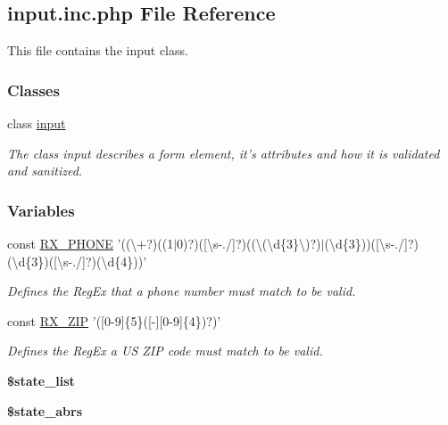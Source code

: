 \hypertarget{input_8inc_8php}{\subsection{input.\-inc.\-php File Reference}
\label{input_8inc_8php}
}


This file contains the input class.  


\subsubsection*{Classes}
\begin{DoxyCompactItemize}
\item 
class \hyperlink{classinput}{input}
\begin{DoxyCompactList}\small\item\em The class input describes a form element, it's attributes and how it is validated and sanitized. \end{DoxyCompactList}\end{DoxyCompactItemize}
\subsubsection*{Variables}
\begin{DoxyCompactItemize}
\item 
\hypertarget{input_8inc_8php_a28a895521a5452ff587c2433af17a5f6}{const \hyperlink{input_8inc_8php_a28a895521a5452ff587c2433af17a5f6}{R\-X\-\_\-\-P\-H\-O\-N\-E} '((\textbackslash{}+?)((1$|$0)?)(\mbox{[}\textbackslash{}s-\/./\mbox{]}?)((\textbackslash{}(\textbackslash{}d\{3\}\textbackslash{})?)$|$(\textbackslash{}d\{3\}))(\mbox{[}\textbackslash{}s-\/./\mbox{]}?)(\textbackslash{}d\{3\})(\mbox{[}\textbackslash{}s-\/./\mbox{]}?)(\textbackslash{}d\{4\}))'}\label{input_8inc_8php_a28a895521a5452ff587c2433af17a5f6}

\begin{DoxyCompactList}\small\item\em Defines the Reg\-Ex that a phone number must match to be valid. \end{DoxyCompactList}\item 
\hypertarget{input_8inc_8php_a4dc6cafe7e22d63d07d3f9227d01fb07}{const \hyperlink{input_8inc_8php_a4dc6cafe7e22d63d07d3f9227d01fb07}{R\-X\-\_\-\-Z\-I\-P} '(\mbox{[}0-\/9\mbox{]}\{5\}(\mbox{[}-\/\mbox{]}\mbox{[}0-\/9\mbox{]}\{4\})?)'}\label{input_8inc_8php_a4dc6cafe7e22d63d07d3f9227d01fb07}

\begin{DoxyCompactList}\small\item\em Defines the Reg\-Ex a U\-S Z\-I\-P code must match to be valid. \end{DoxyCompactList}\item 
\hypertarget{input_8inc_8php_a1709cc1293c85b37bd08c640d66e07cf}{{\bfseries \$state\-\_\-list}}\label{input_8inc_8php_a1709cc1293c85b37bd08c640d66e07cf}

\item 
{\bfseries \$state\-\_\-abrs}
\end{DoxyCompactItemize}


